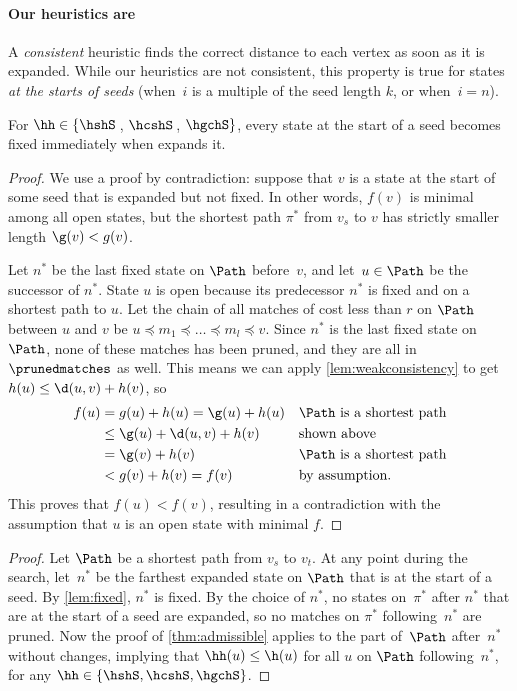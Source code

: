 \paragraph{Our heuristics are \wa}\label{sec:weak-admissible-h}

A \emph{consistent} heuristic finds the correct distance to each vertex as soon
as it is expanded. While our heuristics are not consistent, this property is
true for states \emph{at the starts of seeds} (when~$i$ is a multiple of the
seed length $k$, or when~$i=n$).

\begin{lem}\label{lem:fixed}%
  For $\hh \in \{\hshS$\,, $\hcshS$\,, $\hgchS\}$, every state at the start of a
  seed becomes fixed immediately when \A expands it.
\end{lem}
\begin{proof}
  We use a proof by contradiction: suppose that $v$ is a state at the start of some
  seed that is expanded but not fixed. In other words, $f(v)$ is minimal among
  all open states, but the shortest path $\pi^*$ from $v_s$ to $v$ has strictly
  smaller length ${\g(v) < g(v)}$.

  Let $n^*$ be the last fixed state on $\Path$ before~$v$, and let~$u \in \Path$
  be the successor of $n^*$. State $u$ is open because its predecessor $n^*$ is
  fixed and on a shortest path to $u$. Let the chain of all matches of cost less
  than $r$ on $\Path$ between $u$ and $v$ be ${u\preceq m_1 \preceq \dots
  \preceq m_l \preceq v}$. Since $n^*$ is the last fixed state on $\Path$, none
  of these matches has been pruned, and they are all in $\prunedmatches$ as
  well. This means we can apply \cref{lem:weakconsistency} to get $h(u) \leq
  \d(u, v) + h(v)$, so
  \begin{align*}
    f(u) &= g(u)+h(u)
         = \g(u)+h(u) && \text{$\Path$ is a shortest path} \\
         &\leq \g(u)+\d(u,v)+h(v) && \text{shown above} \\
         &= \g(v) + h(v) &&\text{$\Path$ is a shortest path} \\
         &< g(v)+h(v) = f(v) && \text{by assumption.}
  \end{align*}
  This proves that $f(u) < f(v)$, resulting in a
  contradiction with the assumption that $u$ is an open state with minimal $f$.
\end{proof}

\thmpartialadmissibleh*
\begin{proof}
  Let $\Path$ be a shortest path from $v_s$ to $v_t$. At any point during the \A
  search, let~$n^*$ be the farthest expanded state on $\Path$ that is at the
  start of a seed. By \cref{lem:fixed}, $n^*$ is fixed. By the choice of $n^*$,
  no states on~$\pi^*$ after $n^*$ that are at the start of a seed are expanded,
  so no matches on $\pi^*$ following~$n^*$ are pruned. Now the proof
  of \cref{thm:admissible} applies to the part of~$\Path$ after~$n^*$ without
  changes, implying that $\hh(u) \leq \h(u)$ for all $u$ on $\Path$
  following~$n^*$, for any ${\hh \in \{\hshS, \hcshS, \hgchS\}}$.
\end{proof}
